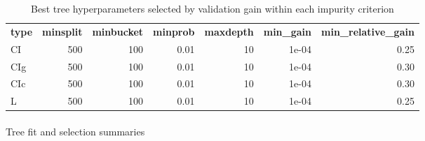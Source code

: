 \documentclass[
  11pt,
  a4paper,
]{article}
\makeatletter
\let\oldparagraph\paragraph
\renewcommand{\paragraph}{
    \@ifstar
      \xxxParagraphStar
      \xxxParagraphNoStar
  }
\newcommand{\xxxParagraphStar}[1]{\oldparagraph*{#1}\mbox{}}
\newcommand{\xxxParagraphNoStar}[1]{\oldparagraph{#1}\mbox{}}
\makeatother
\begin{document}
\begin{longtable}[t]{lrrrrrr}

\caption{\label{tbl-appendix-tree-best-controls}Best tree
hyperparameters selected by validation gain within each impurity
criterion}

\tabularnewline

\\
\toprule
\textbf{type} & \textbf{minsplit} & \textbf{minbucket} & \textbf{minprob} & \textbf{maxdepth} & \textbf{min\_gain} & \textbf{min\_relative\_gain}\\
\midrule
CI & 500 & 100 & 0.01 & 10 & 1e-04 & 0.25\\
CIg & 500 & 100 & 0.01 & 10 & 1e-04 & 0.30\\
CIc & 500 & 100 & 0.01 & 10 & 1e-04 & 0.30\\
L & 500 & 100 & 0.01 & 10 & 1e-04 & 0.25\\
\bottomrule

\end{longtable}

\endgroup{}

\paragraph{Tree fit and selection
summaries}\label{tree-fit-and-selection-summaries}

\begingroup\fontsize{11}{13}\selectfont
\end{document}
